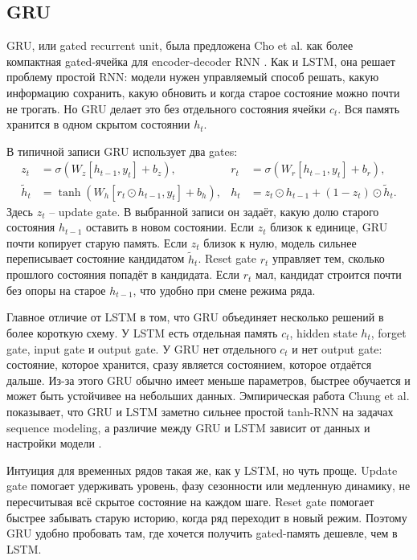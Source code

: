 \documentclass[12pt,fleqn]{article}
\begin{document}
\subsection{GRU}

GRU, или gated recurrent unit, была предложена Cho et al. как более компактная gated-ячейка для encoder-decoder RNN \cite{cho2014}.
Как и LSTM, она решает проблему простой RNN: модели нужен управляемый способ решать, какую информацию сохранить, какую обновить и когда старое состояние можно почти не трогать.
Но GRU делает это без отдельного состояния ячейки $c_t$.
Вся память хранится в одном скрытом состоянии $h_t$.

В типичной записи GRU использует два gates:
\begin{align}
  z_t &= \sigma(W_z [h_{t-1}, y_t] + b_z),
  &
  r_t &= \sigma(W_r [h_{t-1}, y_t] + b_r),
  \\
  \widetilde{h}_t &= \tanh(W_h [r_t \odot h_{t-1}, y_t] + b_h),
  &
  h_t &= z_t \odot h_{t-1} + (1 - z_t) \odot \widetilde{h}_t.
\end{align}
Здесь $z_t$ -- update gate.
В выбранной записи он задаёт, какую долю старого состояния $h_{t-1}$ оставить в новом состоянии.
Если $z_t$ близок к единице, GRU почти копирует старую память.
Если $z_t$ близок к нулю, модель сильнее переписывает состояние кандидатом $\widetilde{h}_t$.
Reset gate $r_t$ управляет тем, сколько прошлого состояния попадёт в кандидата.
Если $r_t$ мал, кандидат строится почти без опоры на старое $h_{t-1}$, что удобно при смене режима ряда.


Главное отличие от LSTM в том, что GRU объединяет несколько решений в более короткую схему.
У LSTM есть отдельная память $c_t$, hidden state $h_t$, forget gate, input gate и output gate.
У GRU нет отдельного $c_t$ и нет output gate: состояние, которое хранится, сразу является состоянием, которое отдаётся дальше.
Из-за этого GRU обычно имеет меньше параметров, быстрее обучается и может быть устойчивее на небольших данных.
Эмпирическая работа Chung et al. показывает, что GRU и LSTM заметно сильнее простой tanh-RNN на задачах sequence modeling, а различие между GRU и LSTM зависит от данных и настройки модели \cite{chung2014}.

Интуиция для временных рядов такая же, как у LSTM, но чуть проще.
Update gate помогает удерживать уровень, фазу сезонности или медленную динамику, не пересчитывая всё скрытое состояние на каждом шаге.
Reset gate помогает быстрее забывать старую историю, когда ряд переходит в новый режим.
Поэтому GRU удобно пробовать там, где хочется получить gated-память дешевле, чем в LSTM.
\end{document}
